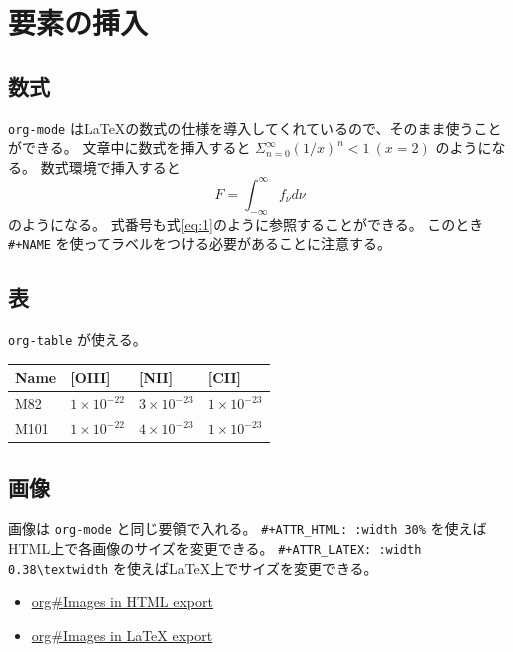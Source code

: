 \documentclass[a4paper, 10pt, notitlepage, uplatex, dvipdfmx]{jsarticle}
\begin{document}
\section{要素の挿入}
\label{sec:orga0b5e0c}
\subsection{数式}
\label{sec:org911c88f}
\texttt{org-mode} は\LaTeX{}の数式の仕様を導入してくれているので、そのまま使うことができる。
文章中に数式を挿入すると \(\Sigma_{n = 0}^{\infty} (1/x)^n < 1\ (x = 2)\) のようになる。
数式環境で挿入すると
\begin{equation}
\label{eq:1}
F = \int_{-\infty}^{\infty} f_{\nu} d\nu
\end{equation}
のようになる。
式番号も式\ref{eq:1}のように参照することができる。
このとき \texttt{\#+NAME} を使ってラベルをつける必要があることに注意する。
\subsection{表}
\label{sec:org1726269}
\texttt{org-table} が使える。

\begin{center}
\begin{tabular}{llll}
\hline
\hline
Name & {[}OIII] & {[}NII] & {[}CII]\\
\hline
M82 & \(1\times10^{-22}\) & \(3\times10^{-23}\) & \(1\times10^{-23}\)\\
M101 & \(1\times10^{-22}\) & \(4\times10^{-23}\) & \(1\times10^{-23}\)\\
\hline
\end{tabular}
\end{center}
\subsection{画像}
\label{sec:orgab0471a}
画像は \texttt{org-mode} と同じ要領で入れる。
\texttt{\#+ATTR\_HTML: :width 30\%} を使えばHTML上で各画像のサイズを変更できる。
\texttt{\#+ATTR\_LATEX: :width 0.38\textbackslash{}textwidth} を使えば\LaTeX{}上でサイズを変更できる。
\begin{itemize}
\item \href{info:org\#Images in HTML export}{org\#Images in HTML export}
\item \href{info:org\#Images in LaTeX export}{org\#Images in \LaTeX{} export}
\end{itemize}
\end{document}

